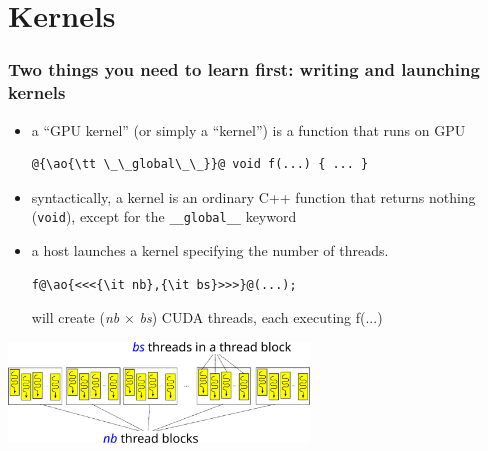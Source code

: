 \documentclass[12pt,dvipdfmx]{beamer}
\newcommand{\ao}[1]{{\color{blue}#1}}
\begin{document}
\section{Kernels}

\begin{frame}[fragile]
  \frametitle{Two things you need to learn first:
    writing and launching kernels}
  \begin{itemize}
  \item a ``GPU kernel'' (or simply a ``kernel'') is a function that runs on GPU
\begin{lstlisting}
@{\ao{\tt \_\_global\_\_}}@ void f(...) { ... }
\end{lstlisting}
\item syntactically, 
  a kernel is an ordinary C++ function that returns nothing ({\tt void}),
  except for the {\ao{\tt \_\_global\_\_}} keyword

\item a host launches a kernel specifying the number of threads.
\begin{lstlisting}
f@\ao{<<<{\it nb},{\it bs}>>>}@(...);
\end{lstlisting}
will create ({\it nb} $\times$ {\it bs}) CUDA threads,
each executing f(...)
\end{itemize}

\begin{center}
  \includegraphics[width=0.6\textwidth]{out/pdf/svg/thread_blocks_1.pdf}
\end{center}

\end{frame}
\end{document}
